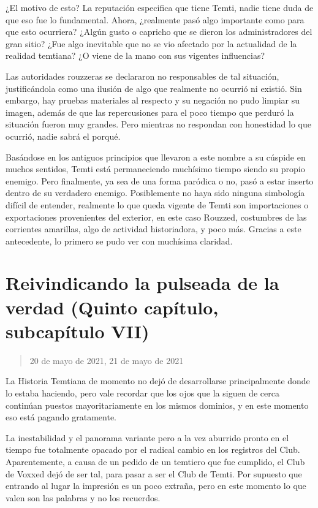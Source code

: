 \documentclass[
  spanish,
]{book}
\begin{document}
¿El motivo de esto? La reputación especifica que tiene Temti, nadie tiene duda de que eso fue lo fundamental. Ahora, ¿realmente pasó algo importante como para que esto ocurriera? ¿Algún gusto o capricho que se dieron los administradores del gran sitio? ¿Fue algo inevitable que no se vio afectado por la actualidad de la realidad temtiana? ¿O viene de la mano con sus vigentes influencias?

Las autoridades rouzzeras se declararon no responsables de tal situación, justificándola como una ilusión de algo que realmente no ocurrió ni existió. Sin embargo, hay pruebas materiales al respecto y su negación no pudo limpiar su imagen, además de que las repercusiones para el poco tiempo que perduró la situación fueron muy grandes. Pero mientras no respondan con honestidad lo que ocurrió, nadie sabrá el porqué.

Basándose en los antiguos principios que llevaron a este nombre a su cúspide en muchos sentidos, Temti está permaneciendo muchísimo tiempo siendo su propio enemigo. Pero finalmente, ya sea de una forma paródica o no, pasó a estar inserto dentro de su verdadero enemigo. Posiblemente no haya sido ninguna simbología difícil de entender, realmente lo que queda vigente de Temti son importaciones o exportaciones provenientes del exterior, en este caso Rouzzed, costumbres de las corrientes amarillas, algo de actividad historiadora, y poco más. Gracias a este antecedente, lo primero se pudo ver con muchísima claridad.

\hypertarget{reivindicando-la-pulseada-de-la-verdad-quinto-capuxedtulo-subcapuxedtulo-vii}{%
\section{Reivindicando la pulseada de la verdad (Quinto capítulo, subcapítulo VII)}\label{reivindicando-la-pulseada-de-la-verdad-quinto-capuxedtulo-subcapuxedtulo-vii}}

\begin{quote}
20 de mayo de 2021, 21 de mayo de 2021
\end{quote}

La Historia Temtiana de momento no dejó de desarrollarse principalmente donde lo estaba haciendo, pero vale recordar que los ojos que la siguen de cerca continúan puestos mayoritariamente en los mismos dominios, y en este momento eso está pagando gratamente.

La inestabilidad y el panorama variante pero a la vez aburrido pronto en el tiempo fue totalmente opacado por el radical cambio en los registros del Club. Aparentemente, a causa de un pedido de un temtiero que fue cumplido, el Club de Voxxed dejó de ser tal, para pasar a ser el Club de Temti. Por supuesto que entrando al lugar la impresión es un poco extraña, pero en este momento lo que valen son las palabras y no los recuerdos.
\end{document}
